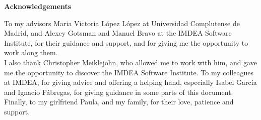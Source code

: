 \newpage

\begin{center}
{\bf \Huge Acknowledgements}
\end{center}

\vspace{1cm}

To my advisors Maria Victoria López López at Universidad Complutense de Madrid, and Alexey Gotsman and Manuel Bravo at the IMDEA Software Institute, for their guidance and support, and for giving me the opportunity to work along them.\\

I also thank Christopher Meiklejohn, who allowed me to work with him, and gave me the opportunity to discover the IMDEA Software Institute. To my colleagues at IMDEA, for giving advice and offering a helping hand, especially Isabel García and Ignacio Fábregas, for giving guidance in some parts of this document.\\

Finally, to my girlfriend Paula, and my family, for their love, patience and support.\\
